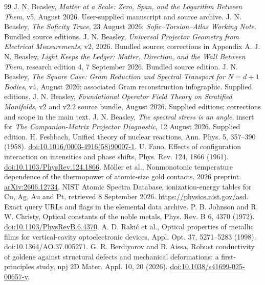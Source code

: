 \documentclass[11pt]{article}
\begin{document}
\begin{thebibliography}{99}
 J. N. Beasley, \emph{Matter at a Scale: Zero, Span, and the Logarithm Between Them}, v5, August 2026. User-supplied manuscript and source archive.
 J. N. Beasley, \emph{The Soficity Trace}, 23 August 2026; \emph{Sofic--Torsion--Atlas Working Note}. Bundled source editions.
 J. N. Beasley, \emph{Universal Projector Geometry from Electrical Measurements}, v2, 2026. Bundled source; corrections in Appendix A.
 J. N. Beasley, \emph{Light Keeps the Ledger: Matter, Direction, and the Wall Between Them}, research edition 4, 7 September 2026. Bundled source edition.
 J. N. Beasley, \emph{The Square Case: Gram Reduction and Spectral Transport for $N=d+1$ Bodies}, v4, August 2026; associated Gram reconstruction infographic. Supplied editions.
 J. N. Beasley, \emph{Foundational Operator Field Theory on Stratified Manifolds}, v2 and v2.2 source bundle, August 2026. Supplied editions; corrections and scope in the main text.
 J. N. Beasley, \emph{The spectral stress is an angle}, insert for \emph{The Companion-Matrix Projector Diagnostic}, 12 August 2026. Supplied edition.
 H. Feshbach, Unified theory of nuclear reactions, Ann. Phys. 5, 357--390 (1958). \href{https://doi.org/10.1016/0003-4916(58)90007-1}{doi:10.1016/0003-4916(58)90007-1}.
 U. Fano, Effects of configuration interaction on intensities and phase shifts, Phys. Rev. 124, 1866 (1961). \href{https://doi.org/10.1103/PhysRev.124.1866}{doi:10.1103/PhysRev.124.1866}.
 M\"oller et al., Nonmonotonic temperature dependence of the thermopower of atomic-size gold contacts, 2026 preprint. \href{https://arxiv.org/abs/2606.12734}{arXiv:2606.12734}.
 NIST Atomic Spectra Database, ionization-energy tables for Cu, Ag, Au and Pt, retrieved 8 September 2026. \url{https://physics.nist.gov/asd}. Exact query URLs and flags in the elemental data archive.
 P. B. Johnson and R. W. Christy, Optical constants of the noble metals, Phys. Rev. B 6, 4370 (1972). \href{https://doi.org/10.1103/PhysRevB.6.4370}{doi:10.1103/PhysRevB.6.4370}.
 A. D. Raki\'c et al., Optical properties of metallic films for vertical-cavity optoelectronic devices, Appl. Opt. 37, 5271--5283 (1998). \href{https://doi.org/10.1364/AO.37.005271}{doi:10.1364/AO.37.005271}.
 G. R. Berdiyorov and B. Aissa, Robust conductivity of goldene against structural defects and mechanical deformations: a first-principles study, npj 2D Mater. Appl. 10, 20 (2026). \href{https://doi.org/10.1038/s41699-025-00657-y}{doi:10.1038/s41699-025-00657-y}.

\end{thebibliography}
\end{document}
